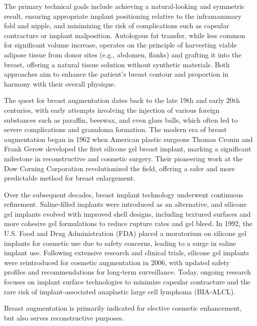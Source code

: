 The primary technical goals include achieving a natural-looking and symmetric result, ensuring appropriate implant positioning relative to the inframammary fold and nipple, and minimizing the risk of complications such as capsular contracture or implant malposition. Autologous fat transfer, while less common for significant volume increase, operates on the principle of harvesting viable adipose tissue from donor sites (e.g., abdomen, flanks) and grafting it into the breast, offering a natural tissue solution without synthetic materials. Both approaches aim to enhance the patient's breast contour and proportion in harmony with their overall physique.

The quest for breast augmentation dates back to the late 19th and early 20th centuries, with early attempts involving the injection of various foreign substances such as paraffin, beeswax, and even glass balls, which often led to severe complications and granuloma formation. The modern era of breast augmentation began in 1962 when American plastic surgeons Thomas Cronin and Frank Gerow developed the first silicone gel breast implant, marking a significant milestone in reconstructive and cosmetic surgery. Their pioneering work at the Dow Corning Corporation revolutionized the field, offering a safer and more predictable method for breast enlargement.

Over the subsequent decades, breast implant technology underwent continuous refinement. Saline-filled implants were introduced as an alternative, and silicone gel implants evolved with improved shell designs, including textured surfaces and more cohesive gel formulations to reduce rupture rates and gel bleed. In 1992, the U.S. Food and Drug Administration (FDA) placed a moratorium on silicone gel implants for cosmetic use due to safety concerns, leading to a surge in saline implant use. Following extensive research and clinical trials, silicone gel implants were reintroduced for cosmetic augmentation in 2006, with updated safety profiles and recommendations for long-term surveillance. Today, ongoing research focuses on implant surface technologies to minimize capsular contracture and the rare risk of implant-associated anaplastic large cell lymphoma (BIA-ALCL).

Breast augmentation is primarily indicated for elective cosmetic enhancement, but also serves reconstructive purposes.

